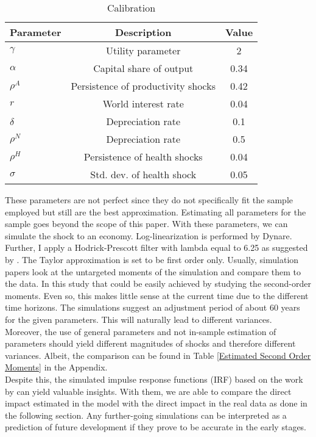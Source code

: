 \documentclass{article}
\begin{document}
\begin{table}[htbp]\centering \caption{Calibration \label{Calibration}}
\begin{tabular}{l c c}\hline\hline
Parameter & Description & Value \\ \hline
$\gamma$ & Utility parameter & 2 \\
$\alpha$ & Capital share of output & 0.34 \\
$\rho^A$ & Persistence of productivity shocks & 0.42 \\
$r$ & World interest rate & 0.04 \\
$\delta$ & Depreciation rate & 0.1 \\
$\rho^N$ & Depreciation rate & 0.5 \\
$\rho^H$ & Persistence of health shocks & 0.04 \\
$\sigma$ & Std. dev. of health shock & 0.05 \\ \hline
\end{tabular}
\end{table}
These parameters are not perfect since they do not specifically fit the sample employed but still are the best approximation. Estimating all parameters for the sample goes beyond the scope of this paper.
With these parameters, we can simulate the shock to an economy. Log-linearization is performed by Dynare. Further, I apply a Hodrick-Prescott filter with lambda equal to 6.25 as suggested by \cite{ravn2002adjusting}. The Taylor approximation is set to be first order only. Usually, simulation papers look at the untargeted moments of the simulation and compare them to the data. In this study that could be easily achieved by studying the second-order moments. Even so, this makes little sense at the current time due to the different time horizons. The simulations suggest an adjustment period of about 60 years for the given parameters. This will naturally lead to different variances. Moreover, the use of general parameters and not in-sample estimation of parameters should yield different magnitudes of shocks and therefore different variances. Albeit, the comparison can be found in Table \ref{Estimated Second Order Moments} in the Appendix. \\
Despite this, the simulated impulse response functions (IRF) based on the work by \cite{jorda2005estimation} can yield valuable insights.
With them, we are able to compare the direct impact estimated in the model with the direct impact in the real data as done in the following section. Any further-going simulations can be interpreted as a prediction of future development if they prove to be accurate in the early stages.\\
\end{document}

